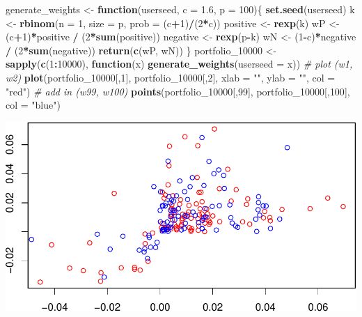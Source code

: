\documentclass[11pt,]{article}
\newenvironment{Shaded}{\begin{snugshade}}{\end{snugshade}}
\newcommand{\KeywordTok}[1]{\textcolor[rgb]{0.13,0.29,0.53}{\textbf{#1}}}
\newcommand{\DataTypeTok}[1]{\textcolor[rgb]{0.13,0.29,0.53}{#1}}
\newcommand{\DecValTok}[1]{\textcolor[rgb]{0.00,0.00,0.81}{#1}}
\newcommand{\FloatTok}[1]{\textcolor[rgb]{0.00,0.00,0.81}{#1}}
\newcommand{\StringTok}[1]{\textcolor[rgb]{0.31,0.60,0.02}{#1}}
\newcommand{\CommentTok}[1]{\textcolor[rgb]{0.56,0.35,0.01}{\textit{#1}}}
\newcommand{\ControlFlowTok}[1]{\textcolor[rgb]{0.13,0.29,0.53}{\textbf{#1}}}
\newcommand{\OperatorTok}[1]{\textcolor[rgb]{0.81,0.36,0.00}{\textbf{#1}}}
\newcommand{\NormalTok}[1]{#1}
\begin{document}
\begin{Shaded}
\begin{Highlighting}[]
\NormalTok{generate_weights <-}\StringTok{ }\ControlFlowTok{function}\NormalTok{(userseed, }\DataTypeTok{c =} \FloatTok{1.6}\NormalTok{, }\DataTypeTok{p =} \DecValTok{100}\NormalTok{)\{}
  \KeywordTok{set.seed}\NormalTok{(userseed)}
\NormalTok{  k <-}\StringTok{ }\KeywordTok{rbinom}\NormalTok{(}\DataTypeTok{n =} \DecValTok{1}\NormalTok{, }\DataTypeTok{size =}\NormalTok{ p, }\DataTypeTok{prob =}\NormalTok{ (c}\OperatorTok{+}\DecValTok{1}\NormalTok{)}\OperatorTok{/}\NormalTok{(}\DecValTok{2}\OperatorTok{*}\NormalTok{c))}
\NormalTok{  positive <-}\StringTok{ }\KeywordTok{rexp}\NormalTok{(k)}
\NormalTok{  wP <-}\StringTok{ }\NormalTok{(c}\OperatorTok{+}\DecValTok{1}\NormalTok{)}\OperatorTok{*}\NormalTok{positive }\OperatorTok{/}\StringTok{ }\NormalTok{(}\DecValTok{2}\OperatorTok{*}\KeywordTok{sum}\NormalTok{(positive)) }
\NormalTok{  negative <-}\StringTok{ }\KeywordTok{rexp}\NormalTok{(p}\OperatorTok{-}\NormalTok{k)}
\NormalTok{  wN <-}\StringTok{ }\NormalTok{(}\DecValTok{1}\OperatorTok{-}\NormalTok{c)}\OperatorTok{*}\NormalTok{negative }\OperatorTok{/}\StringTok{ }\NormalTok{(}\DecValTok{2}\OperatorTok{*}\KeywordTok{sum}\NormalTok{(negative))}
  \KeywordTok{return}\NormalTok{(}\KeywordTok{c}\NormalTok{(wP, wN)) }
\NormalTok{\}}
\NormalTok{portfolio_}\DecValTok{10000}\NormalTok{ <-}\StringTok{ }\KeywordTok{sapply}\NormalTok{(}\KeywordTok{c}\NormalTok{(}\DecValTok{1}\OperatorTok{:}\DecValTok{10000}\NormalTok{), }\ControlFlowTok{function}\NormalTok{(x) }\KeywordTok{generate_weights}\NormalTok{(}\DataTypeTok{userseed =}\NormalTok{ x)) }
\CommentTok{# plot (w1, w2)}
\KeywordTok{plot}\NormalTok{(portfolio_}\DecValTok{10000}\NormalTok{[,}\DecValTok{1}\NormalTok{], portfolio_}\DecValTok{10000}\NormalTok{[,}\DecValTok{2}\NormalTok{], }\DataTypeTok{xlab =} \StringTok{""}\NormalTok{, }\DataTypeTok{ylab =} \StringTok{""}\NormalTok{, }\DataTypeTok{col =} \StringTok{"red"}\NormalTok{)}
\CommentTok{# add in (w99, w100)}
\KeywordTok{points}\NormalTok{(portfolio_}\DecValTok{10000}\NormalTok{[,}\DecValTok{99}\NormalTok{], portfolio_}\DecValTok{10000}\NormalTok{[,}\DecValTok{100}\NormalTok{], }\DataTypeTok{col =} \StringTok{"blue"}\NormalTok{)}
\end{Highlighting}
\end{Shaded}

\includegraphics{hw4_files/figure-latex/unnamed-chunk-7-1.pdf}
\end{document}
